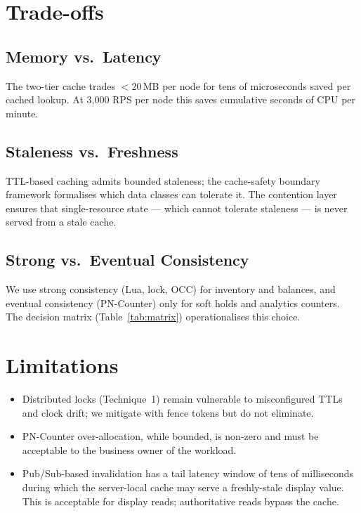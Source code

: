 \documentclass[12pt,a4paper,oneside]{report}
\begin{document}
\section{Trade-offs}

\subsection{Memory vs.\ Latency}
The two-tier cache trades $<$20\,MB per node for tens of microseconds saved per cached lookup. At 3{,}000 RPS per node this saves cumulative seconds of CPU per minute.

\subsection{Staleness vs.\ Freshness}
TTL-based caching admits bounded staleness; the cache-safety boundary framework formalises which data classes can tolerate it. The contention layer ensures that single-resource state --- which cannot tolerate staleness --- is never served from a stale cache.

\subsection{Strong vs.\ Eventual Consistency}
We use strong consistency (Lua, lock, OCC) for inventory and balances, and eventual consistency (PN-Counter) only for soft holds and analytics counters. The decision matrix (Table~\ref{tab:matrix}) operationalises this choice.

\section{Limitations}
\begin{itemize}[leftmargin=*]
    \item Distributed locks (Technique~1) remain vulnerable to misconfigured TTLs and clock drift; we mitigate with fence tokens but do not eliminate.
    \item PN-Counter over-allocation, while bounded, is non-zero and must be acceptable to the business owner of the workload.
    \item Pub/Sub-based invalidation has a tail latency window of tens of milliseconds during which the server-local cache may serve a freshly-stale display value. This is acceptable for display reads; authoritative reads bypass the cache.
\end{itemize}

\end{document}
